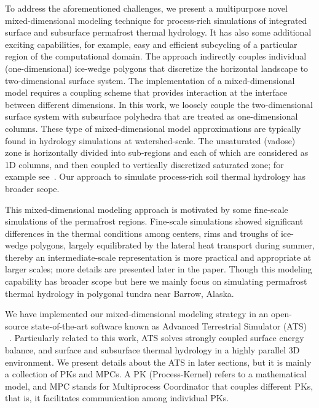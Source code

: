 \documentclass[review]{elsarticle}
\begin{document}
To address the aforementioned challenges, we present a multipurpose novel mixed-dimensional modeling technique for process-rich simulations of integrated surface and subsurface permafrost thermal hydrology.  It has also some additional exciting capabilities, for example, easy and efficient subcycling of a particular region of the computational domain. The approach indirectly couples individual (one-dimensional) ice-wedge polygons that discretize the horizontal landscape to two-dimensional surface system. The implementation of a mixed-dimensional model requires a coupling scheme that provides interaction at the interface between different dimensions. In this work, we loosely couple the two-dimensional surface system with subsurface polyhedra that are treated as one-dimensional columns. These type of mixed-dimensional model approximations are typically found in hydrology simulations at watershed-scale. The unsaturated (vadose) zone is horizontally divided into sub-regions and each of which are considered as 1D columns, and then coupled to vertically discretized saturated zone; for example see~\cite{pikul1974numerical,zhu2011method}. Our approach to simulate process-rich soil thermal hydrology has broader scope.

This mixed-dimensional modeling approach is motivated by some fine-scale simulations of the permafrost regions. Fine-scale simulations showed significant differences in the thermal conditions among centers, rims and troughs of ice-wedge polygons, largely equilibrated by the lateral heat transport during summer, thereby an intermediate-scale representation is more practical and appropriate at larger scales; more details are presented later in the paper. Though this modeling capability has broader scope but here we mainly focus on simulating permafrost thermal hydrology in polygonal tundra near Barrow, Alaska. 

We have implemented our mixed-dimensional modeling strategy in an open-source state-of-the-art software known as Advanced Terrestrial Simulator (ATS) 
~\cite{ecoon2016managing, spainter2016integrated}. Particularly related to this work, ATS solves strongly coupled surface energy balance, and surface and subsurface thermal hydrology in a highly parallel 3D environment. We present details about the ATS in later sections, but it is mainly a collection of PKs and MPCs. A PK (Process-Kernel) refers to a mathematical model, and MPC stands for Multiprocess Coordinator that couples different PKs, that is, it facilitates communication among individual PKs.
\end{document}

